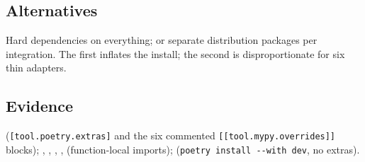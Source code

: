 \subsection*{Alternatives}

Hard dependencies on everything; or separate distribution packages per
integration. The first inflates the install; the second is disproportionate for
six thin adapters.

\subsection*{Evidence}

 (\texttt{[tool.poetry.extras]} and the six commented
\texttt{[[tool.mypy.overrides]]} blocks);
,
, ,
,  (function-local imports);
 (\texttt{poetry install -{}-with dev}, no
extras).
